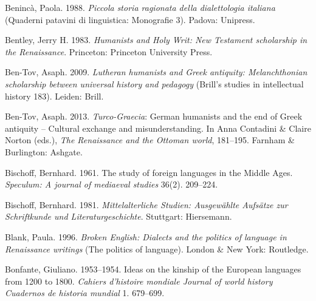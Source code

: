 \begin{styleStandard}
Benincà, Paola. 1988. \textit{Piccola storia ragionata della dialettologia italiana} (Quaderni patavini di linguistica: Monografie 3). Padova: Unipress.
\end{styleStandard}

\begin{styleStandard}
Bentley, Jerry H. 1983. \textit{Humanists and Holy Writ: New Testament scholarship in the Renaissance}. Princeton: Princeton University Press.
\end{styleStandard}

\begin{styleStandard}
Ben-Tov, Asaph. 2009. \textit{Lutheran humanists and Greek antiquity: Melanchthonian scholarship between universal history and pedagogy} (Brill’s studies in intellectual history 183). Leiden: Brill.
\end{styleStandard}

\begin{styleStandard}
Ben-Tov, Asaph. 2013. \textit{Turco-Graecia}: German humanists and the end of Greek antiquity – Cultural exchange and misunderstanding. In Anna Contadini \& Claire Norton (eds.), \textit{The Renaissance and the Ottoman world}, 181–195. Farnham \& Burlington: Ashgate.
\end{styleStandard}

\begin{styleStandard}
Bischoff, Bernhard. 1961. The study of foreign languages in the Middle Ages. \textit{Speculum: A journal of mediaeval studies} 36(2). 209–224.
\end{styleStandard}

\begin{styleStandard}
Bischoff, Bernhard. 1981. \textit{Mittelalterliche Studien: Ausgewählte Aufsätze zur Schriftkunde und Literaturgeschichte}. Stuttgart: Hiersemann.
\end{styleStandard}

\begin{styleStandard}
Blank, Paula. 1996. \textit{Broken English: Dialects and the politics of language in Renaissance writings} (The politics of language). London \& New York: Routledge.
\end{styleStandard}

\begin{styleStandard}
Bonfante, Giuliano. 1953–1954. Ideas on the kinship of the European languages from 1200 to 1800. \textit{Cahiers d’histoire mondiale {\textbar} Journal of world history {\textbar} Cuadernos de historia mundial} 1. 679–699.
\end{styleStandard}

